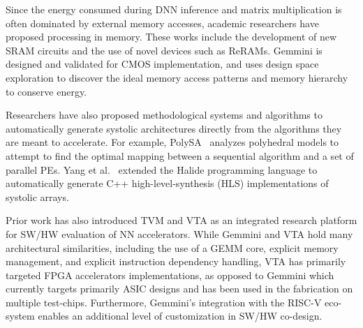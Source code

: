 Since the energy consumed during DNN inference and matrix multiplication is often dominated by external memory accesses, academic researchers have proposed processing in memory\cite{liu2018,chi2016,yan2018,yan2018_2,zha2019,ji2019,chang2019}. These works include the development of new SRAM circuits and the use of novel devices such as ReRAMs. Gemmini is designed and validated for CMOS implementation, and uses design space exploration to discover the ideal memory access patterns and memory hierarchy to conserve energy.

Researchers have also proposed methodological systems and algorithms to automatically generate systolic architectures directly from the algorithms they are meant to accelerate. For example, PolySA~\cite{polysa} analyzes polyhedral models to attempt to find the optimal mapping between a sequential algorithm and a set of parallel PEs. Yang et al.~\cite{overrrated} extended the Halide programming language to automatically generate C++ high-level-synthesis (HLS) implementations of systolic arrays.

Prior work has also introduced TVM \cite{chen2018} and VTA \cite{moreau2018} as an integrated research platform for SW/HW evaluation of NN accelerators. While Gemmini and VTA hold many architectural similarities, including the use of a GEMM core, explicit memory management, and explicit instruction dependency handling, VTA has primarily targeted FPGA accelerators implementations, as opposed to Gemmini which currently targets primarily ASIC designs and has been used in the fabrication on multiple test-chips. Furthermore, Gemmini's integration with the RISC-V eco-system enables an additional level of customization in SW/HW co-design. 




